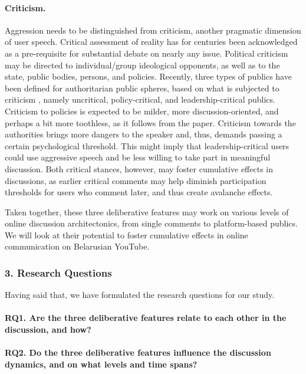\paragraph{Criticism.} Aggression needs to be distinguished from criticism, another pragmatic dimension of user speech. Critical assessment of reality has for centuries been acknowledged as a pre-requisite for substantial debate on nearly any issue. Political criticism may be directed to individual/group ideological opponents, as well as to the state, public bodies, persons, and policies. Recently, three types of publics have been defined for authoritarian public spheres, based on what is subjected to criticism \cite{Toepfl}, namely uncritical, policy-critical, and leadership-critical publics. Criticism to policies is expected to be milder, more discussion-oriented, and perhaps a bit more toothless, as it follows from the paper. Criticism towards the authorities brings more dangers to the speaker and, thus, demands passing a certain psychological threshold. This might imply that leadership-critical users could use aggressive speech and be less willing to take part in meaningful discussion. Both critical stances, however, may foster cumulative effects in discussions, as earlier critical comments may help diminish participation thresholds for users who comment later, and thus create avalanche effects.

Taken together, these three deliberative features may work on various levels of online discussion architectonics, from single comments to platform-based publics. We will look at their potential to foster cumulative effects in online communication on Belarusian YouTube.

\subsubsection{3. Research Questions}
Having said that, we have formulated the research questions for our study.

\paragraph{RQ1. Are the three deliberative features relate to each other in the discussion, and how?}

\paragraph{RQ2. Do the three deliberative features influence the discussion dynamics, and on what levels and time spans?}

